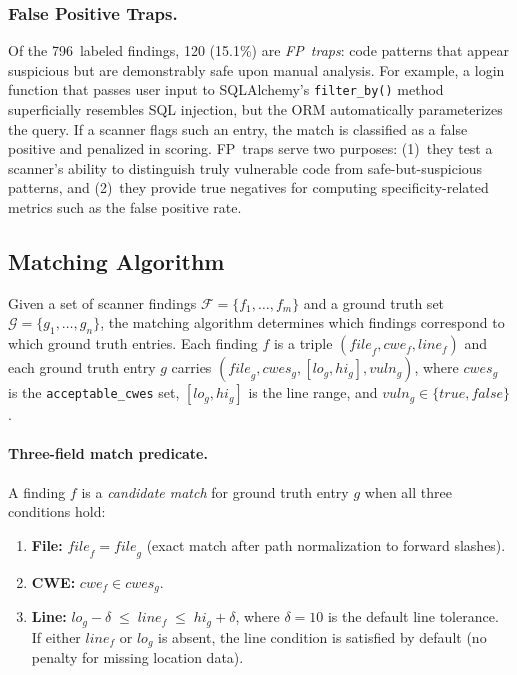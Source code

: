 \subsubsection{False Positive Traps.}
Of the 796~labeled findings, 120 (15.1\%) are \emph{FP~traps}: code patterns that appear suspicious but are demonstrably safe upon manual analysis.
For example, a login function that passes user input to SQLAlchemy's \texttt{filter\_by()} method superficially resembles SQL injection, but the ORM automatically parameterizes the query.
If a scanner flags such an entry, the match is classified as a false positive and penalized in scoring.
FP~traps serve two purposes: (1)~they test a scanner's ability to distinguish truly vulnerable code from safe-but-suspicious patterns, and (2)~they provide true negatives for computing specificity-related metrics such as the false positive rate.

\subsection{Matching Algorithm}
\label{sec:matching}

Given a set of scanner findings $\mathcal{F} = \{f_1, \ldots, f_m\}$ and a ground truth set $\mathcal{G} = \{g_1, \ldots, g_n\}$, the matching algorithm determines which findings correspond to which ground truth entries.
Each finding $f$ is a triple $(\mathit{file}_f, \mathit{cwe}_f, \mathit{line}_f)$ and each ground truth entry $g$ carries $(\mathit{file}_g, \mathit{cwes}_g, [\mathit{lo}_g, \mathit{hi}_g], \mathit{vuln}_g)$, where $\mathit{cwes}_g$ is the \texttt{acceptable\_cwes} set, $[\mathit{lo}_g, \mathit{hi}_g]$ is the line range, and $\mathit{vuln}_g \in \{\mathit{true}, \mathit{false}\}$.

\paragraph{Three-field match predicate.}
A finding $f$ is a \emph{candidate match} for ground truth entry $g$ when all three conditions hold:
\begin{enumerate}
  \item \textbf{File:} $\mathit{file}_f = \mathit{file}_g$ \quad (exact match after path normalization to forward slashes).
  \item \textbf{CWE:} $\mathit{cwe}_f \in \mathit{cwes}_g$.
  \item \textbf{Line:} $\mathit{lo}_g - \delta \;\leq\; \mathit{line}_f \;\leq\; \mathit{hi}_g + \delta$, \quad where $\delta = 10$ is the default line tolerance.
        If either $\mathit{line}_f$ or $\mathit{lo}_g$ is absent, the line condition is satisfied by default (no penalty for missing location data).
\end{enumerate}

